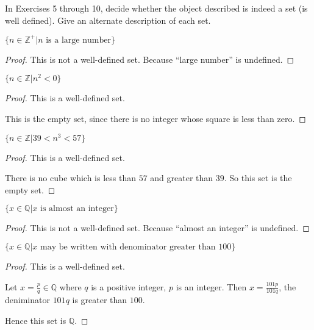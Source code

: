 In Exercises 5 through 10, decide whether the object described is indeed a set (is well defined). Give an alternate description of each set.

\begin{exercise}
    $\{ n\in\mathbb{Z}^{+} \vert \text{$n$ is a large number} \}$
\end{exercise}

\begin{proof}
    This is not a well-defined set. Because ``large number'' is undefined.
\end{proof}

\begin{exercise}
    $\{ n\in\mathbb{Z} \vert n^{2} < 0 \}$
\end{exercise}

\begin{proof}
    This is a well-defined set.

    This is the empty set, since there is no integer whose square is less than zero.
\end{proof}

\begin{exercise}
    $\{ n\in\mathbb{Z} \vert 39 < n^{3} < 57 \}$
\end{exercise}

\begin{proof}
    This is a well-defined set.

    There is no cube which is less than $57$ and greater than $39$. So this set is the empty set.
\end{proof}

\begin{exercise}
    $\{ x\in\mathbb{Q} \vert \text{$x$ is almost an integer} \}$
\end{exercise}

\begin{proof}
    This is not a well-defined set. Because ``almost an integer'' is undefined.
\end{proof}

\begin{exercise}
    $\{ x\in\mathbb{Q} \vert \text{$x$ may be written with denominator greater than $100$} \}$
\end{exercise}

\begin{proof}
    This is a well-defined set.

    Let $x = \frac{p}{q}\in\mathbb{Q}$ where $q$ is a positive integer, $p$ is an integer. Then $x = \frac{101p}{101q}$, the deniminator $101q$ is greater than $100$.

    Hence this set is $\mathbb{Q}$.
\end{proof}


